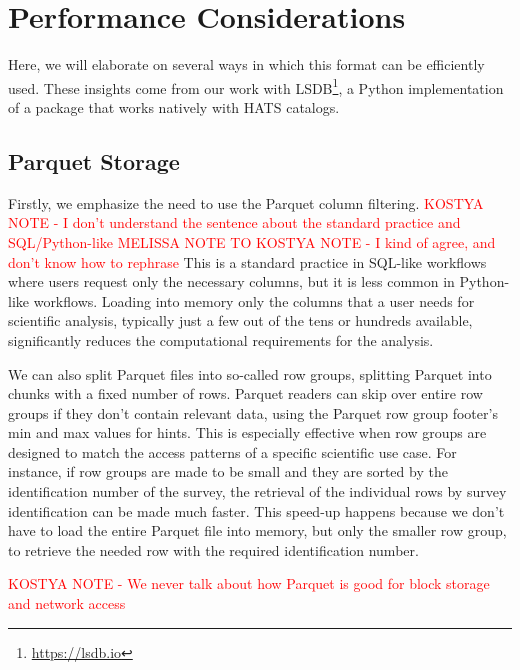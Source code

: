 \documentclass[11pt,a4paper]{ivoa}
\begin{document}
\section{Performance Considerations}
Here, we will elaborate on several ways in which this format can be efficiently used. These insights come from our work with LSDB\footnote{\url{https://lsdb.io}}, a Python implementation of a package that works natively with HATS catalogs. \par

\subsection{Parquet Storage}\label{sec:parquetPerformance}
Firstly, we emphasize the need to use the Parquet column filtering. 
\textcolor{red}{KOSTYA NOTE - I don't understand the sentence about the standard practice and SQL/Python-like}
\textcolor{red}{MELISSA NOTE TO KOSTYA NOTE - I kind of agree, and don't know how to rephrase}
This is a standard practice in SQL-like workflows where users request only the necessary columns, but it is less common in Python-like workflows. 
Loading into memory only the columns that a user needs for scientific analysis, typically just a few out of the tens or hundreds available, significantly reduces the computational requirements for the analysis.  \par 

We can also split Parquet files into so-called row groups, splitting Parquet into chunks with a fixed number of rows. 
Parquet readers can skip over entire row groups if they don't contain relevant data, using the Parquet row group footer's min and max values for hints. 
This is especially effective when row groups are designed to match the access patterns of a specific scientific use case. 
For instance, if row groups are made to be small and they are sorted by the identification number of the survey, the retrieval of the individual rows by survey identification can be made much faster. 
This speed-up happens because we don't have to load the entire Parquet file into memory, but only the smaller row group, to retrieve the needed row with the required identification number.\par 
\textcolor{red}{KOSTYA NOTE - We never talk about how Parquet is good for block storage and network access}
\end{document}
